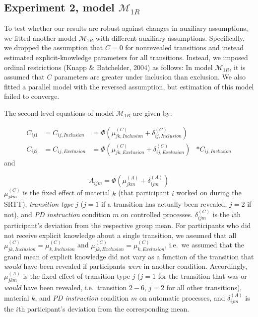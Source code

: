 \documentclass[english,,man]{apa6}
\begin{document}
\begin{appendix}
\hypertarget{experiment-2-model-mathcalm_1r}{%
\subsection{\texorpdfstring{Experiment 2, model
\(\mathcal{M}_{1R}\)}{Experiment 2, model \textbackslash{}mathcal\{M\}\_\{1R\}}}\label{experiment-2-model-mathcalm_1r}}

To test whether our results are robust against changes in auxiliary
assumptions, we fitted another model \(\mathcal{M}_{1R}\) with different
auxiliary assumptions. Specifically, we dropped the assumption that
\(C=0\) for nonrevealed transitions and instead estimated
explicit-knowledge parameters for all transitions. Instead, we imposed
ordinal restrictions (Knapp \& Batchelder, 2004) as follows: In model
\(\mathcal{M}_{1R}\), it is assumed that \(C\) parameters are greater
under inclusion than exclusion. We also fitted a parallel model with the
reversed assumption, but estimation of this model failed to converge.

The second-level equations of model \(\mathcal{M}_{1R}\) are given by:

\[
\begin{aligned}
C_{ij1} &= C_{ij, Inclusion} &= \Phi(\mu_{jk,Inclusion}^{(C)} + \delta_{ij, Inclusion}^{(C)})& \\
C_{ij2} &= C_{ij, Exclusion} &= \Phi(\mu_{jk,Exclusion}^{(C)} + \delta_{ij, Exclusion}^{(C)})& * C_{ij, Inclusion}
\end{aligned}
\] and

\[
A_{ijm} = \Phi(\mu_{jkm}^{(A)} + \delta_{ijm}^{(A)})
\] \(\mu_{jkm}^{(C)}\) is the fixed effect of material \(k\) (that
participant \(i\) worked on during the SRTT), \emph{transition type}
\(j\) (\(j = 1\) if a transition has actually been revealed, \(j=2\) if
not), and \emph{PD instruction} condition \(m\) on controlled processes.
\(\delta_{ijm}^{(C)}\) is the \(i\)th participant's deviation from the
respective group mean. For participants who did not receive explicit
knowledge about a single transition, we assumed that all
\(\mu_{jk, Inclusion}^{(C)} = \mu_{k, Inclusion}^{(C)}\) and
\(\mu_{jk, Exclusion}^{(C)} = \mu_{k, Exclusion}^{(C)}\), i.e.~we
assumed that the grand mean of explicit knowledge did not vary as a
function of the transition that \emph{would} have been revealed if
participants \emph{were} in another condition. Accordingly,
\(\mu_{jkm}^{(A)}\) is the fixed effect of transition type \(j\)
(\(j = 1\) for the transition that was or \emph{would} have been
revealed, i.e.~transition \(2{-}6\), \(j=2\) for all other transitions),
material \(k\), and \emph{PD instruction} condition \(m\) on automatic
processes, and \(\delta_{ijm}^{(A)}\) is the \(i\)th participant's
deviation from the corresponding mean.


\end{appendix}
\end{document}
